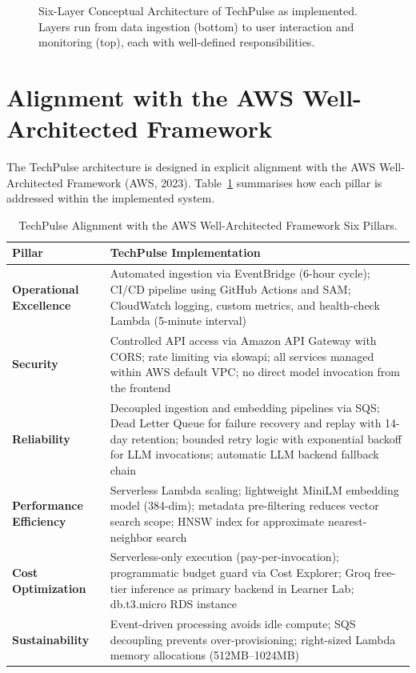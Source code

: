 \documentclass[12pt,a4paper]{report}
\begin{document}
\begin{figure}[H]
\caption{Six-Layer Conceptual Architecture of TechPulse as implemented. Layers run from data ingestion (bottom) to user interaction and monitoring (top), each with well-defined responsibilities.}
\label{fig:six_layers}
\end{figure}

\section{Alignment with the AWS Well-Architected Framework}
\label{sec:well_architected}

The TechPulse architecture is designed in explicit alignment with the AWS Well-Architected Framework (AWS, 2023). Table~\ref{tab:well_arch} summarises how each pillar is addressed within the implemented system.

\begin{table}[H]
\caption{TechPulse Alignment with the AWS Well-Architected Framework Six Pillars.}
\label{tab:well_arch}
\centering
\begin{tabular}{p{3.2cm}p{9.3cm}}
\toprule
\textbf{Pillar} & \textbf{TechPulse Implementation} \\
\midrule
\textbf{Operational Excellence} & Automated ingestion via EventBridge (6-hour cycle); CI/CD pipeline using GitHub Actions and SAM; CloudWatch logging, custom metrics, and health-check Lambda (5-minute interval) \\[4pt]
\textbf{Security} & Controlled API access via Amazon API Gateway with CORS; rate limiting via slowapi; all services managed within AWS default VPC; no direct model invocation from the frontend \\[4pt]
\textbf{Reliability} & Decoupled ingestion and embedding pipelines via SQS; Dead Letter Queue for failure recovery and replay with 14-day retention; bounded retry logic with exponential backoff for LLM invocations; automatic LLM backend fallback chain \\[4pt]
\textbf{Performance Efficiency} & Serverless Lambda scaling; lightweight MiniLM embedding model (384-dim); metadata pre-filtering reduces vector search scope; HNSW index for approximate nearest-neighbor search \\[4pt]
\textbf{Cost Optimization} & Serverless-only execution (pay-per-invocation); programmatic budget guard via Cost Explorer; Groq free-tier inference as primary backend in Learner Lab; db.t3.micro RDS instance \\[4pt]
\textbf{Sustainability} & Event-driven processing avoids idle compute; SQS decoupling prevents over-provisioning; right-sized Lambda memory allocations (512MB--1024MB) \\
\bottomrule
\end{tabular}
\end{table}
\end{document}
